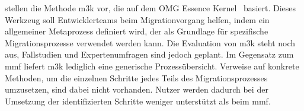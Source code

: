  stellen die Methode \gls{m3k} vor, die auf dem OMG Essence Kernel~\cite{essence-kernel-omg} basiert.
Dieses Werkzeug soll Ent\-wick\-ler\-teams beim Migrationvorgang helfen, indem ein allgemeiner Metaprozess definiert wird, der als Grundlage für spezifische Migrationsprozesse verwendet werden kann.
Die Evaluation von \gls{m3k} steht noch aus, Fallstudien und Expertenumfragen sind jedoch geplant.
Im Gegensatz zum \gls{mmf} liefert \gls{m3k} lediglich eine generische Prozessübersicht.
Verweise auf konkrete Methoden, um die einzelnen Schritte jedes Teils des Migrationsprozesses umzusetzen, sind dabei nicht vorhanden.
Nutzer werden dadurch bei der Umsetzung der identifizierten Schritte weniger unterstützt als beim \gls{mmf}.



